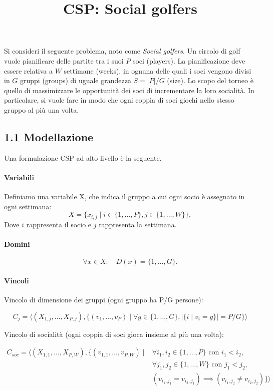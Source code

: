 \documentclass[a4paper,11pt]{article}
\title{CSP: Social golfers }
\date{}
\begin{document}
\maketitle

Si consideri il seguente problema, noto come \emph{Social golfers}.
Un circolo di golf vuole pianificare delle partite tra i suoi $P$ soci (players). La pianificazione deve essere relativa a $W$ settimane (weeks), in ognuna delle quali i soci vengono divisi in $G$ gruppi (groups) di uguale grandezza $S = |P|/G$ (size).
Lo scopo del torneo è quello di massimizzare le opportunità dei soci di incrementare la loro socialità. In particolare, si vuole fare in modo che ogni coppia di soci giochi nello stesso gruppo al più una volta.

\subsection*{1.1 Modellazione} 
Una formulazione CSP ad alto livello è la seguente.

\paragraph{Variabili}
Definiamo una variabile X, che indica il gruppo a cui ogni socio è assegnato in ogni settimana:
\[
X = \{x_{i,j} \mid i \in \{1, \ldots, P\}, j \in \{1, \ldots, W\}\},
\]
Dove $i$ rappresenta il socio e $j$ rappresenta la settimana. 

\paragraph{Domini}
\[
\forall x \in X:\quad D(x)=\{1,\ldots,G\}.
\]

\paragraph{Vincoli}

Vincolo di dimensione dei gruppi (ogni gruppo ha P/G persone):

\[ C_j = \langle (X_{1,j}, \dots, X_{P,j}), \{ (v_1, \dots, v_P) \mid \forall g \in \{1, \dots, G\}, |\{i \mid v_i = g\}| = P/G \} \rangle \]

Vincolo di socialità (ogni coppia di soci gioca insieme al più una volta):

\[
\begin{aligned}
C_{soc} = \langle (X_{1,1}, \dots, X_{P,W}), \{ (v_{1,1}, \dots, v_{P,W}) \mid & \forall i_1, i_2 \in \{1, \dots, P\} \text{ con } i_1 < i_2, \\
& \forall j_1, j_2 \in \{1, \dots, W\} \text{ con } j_1 < j_2, \\
& (v_{i_1,j_1} = v_{i_2,j_1}) \implies (v_{i_1,j_2} \neq v_{i_2,j_2}) \} \rangle
\end{aligned}
\]
\end{document}
